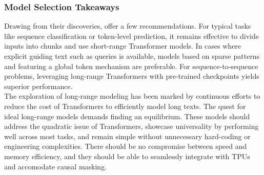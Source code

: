 \subsubsection{Model Selection Takeaways} 

Drawing from their discoveries, \citet{qin2022nlp} offer a few recommendations. For typical tasks like sequence classification or token-level prediction, it remains effective to divide inputs into chunks and use short-range Transformer models. In cases where explicit guiding text such as queries is available, models based on sparse patterns and featuring a global token mechanism are preferable. For sequence-to-sequence problems, leveraging long-range Transformers with pre-trained checkpoints yields superior performance. \\

The exploration of long-range modeling has been marked by continuous efforts to reduce the cost of Transformers to efficiently model long texts. The quest for ideal long-range models demands finding an equilibrium. These models should address the quadratic issue of Transformers, showcase universality by performing well across most tasks, and remain simple without unnecessary hard-coding or engineering complexities. There should be no compromise between speed and memory efficiency, and they should be able to seamlessly integrate with TPUs and accomodate causal masking. 

\acresetall
